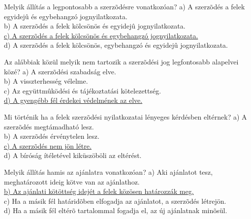 \begin{frame}

\begin{tcolorbox}[title={148. Kérdés}]
Melyik állítás a legpontosabb a szerzõdésre vonatkozóan?
\tcblower
a) A szerzõdés a felek egyidejû és egybehangzó jognyilatkozata.\\
b) A szerzõdés a felek kölcsönös és egyidejû jognyilatkozata.\\
\uline {c) A szerzõdés a felek kölcsönös és egybehangzó jognyilatkozata.}\\
d) A szerzõdés a felek kölcsönös, egybehangzó és egyidejû jognyilatkozata.
\end{tcolorbox}

\begin{tcolorbox}[title={149. Kérdés}]
Az alábbiak közül melyik nem tartozik a szerzõdési jog legfontosabb alapelvei közé?
\tcblower
a) A szerzõdési szabadság elve.\\
b) A visszterhesség vélelme.\\
c) Az együttmûködési és tájékoztatási kötelezettség.\\
\uline {d) A gyengébb fél érdekei védelmének az elve.}
\end{tcolorbox}

\begin{tcolorbox}[title={150. Kérdés}]
Mi történik ha a felek szerzõdési nyilatkozatai lényeges kérdésben eltérnek?
\tcblower
a) A szerzõdés megtámadható lesz.\\
b) A szerzõdés érvénytelen lesz.\\
\uline {c) A szerzõdés nem jön létre.}\\
d) A bíróság ítéletével kiküszöböli az eltérést.
\end{tcolorbox}

\begin{tcolorbox}[title={151. Kérdés}]
Melyik állítás hamis az ajánlatra vonatkozóan?
\tcblower
a) Aki ajánlatot tesz, meghatározott ideig kötve van az ajánlathoz.\\
\uline {b) Az ajánlati kötöttség idejét a felek közösen határozzák meg.}\\
c) Ha a másik fél határidõben elfogadja az ajánlatot, a szerzõdés létrejön.\\
d) Ha a másik fél eltérõ tartalommal fogadja el, az új ajánlatnak minõsül.
\end{tcolorbox}

\end{frame}


